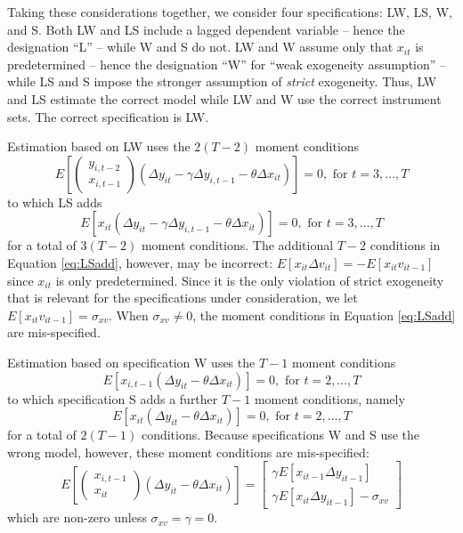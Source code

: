 Taking these considerations together, we consider four specifications: LW, LS, W, and S. 
Both LW and LS include a lagged dependent variable -- hence the designation ``L'' -- while W and S do not. 
LW and W assume only that $x_{it}$ is predetermined -- hence the designation ``W'' for ``weak exogeneity assumption'' -- while LS and S impose the stronger assumption of \emph{strict} exogeneity. 
Thus, LW and LS estimate the correct model while LW and W use the correct instrument sets. 
The correct specification is LW.

Estimation based on LW uses the $2(T - 2)$ moment conditions
	\begin{equation}
E\left[ \left(\begin{array}{c} y_{i,t-2}\\ x_{i,t-1}
\end{array}\right)\left(\Delta y_{it} - \gamma\Delta y_{i,t-1} -\theta \Delta x_{it}\right)\right] = 0, \mbox{ for } t = 3, \hdots, T
\end{equation}
to which LS adds 
	\begin{equation}
	\label{eq:LSadd}
	E\left[ x_{it}\left(\Delta y_{it} - \gamma\Delta y_{i,t-1} -\theta \Delta x_{it}\right)\right] = 0, \mbox{ for } t = 3, \hdots, T
\end{equation}
for a total of $3(T - 2)$ moment conditions. The additional $T-2$ conditions in Equation \ref{eq:LSadd}, however, may be incorrect: $E[x_{it}\Delta v_{it}] = -E[x_{it}v_{it-1}]$ since $x_{it}$ is only predetermined. Since it is the only violation of strict exogeneity that is relevant for the specifications under consideration, we let $E[x_{it}v_{it-1}] = \sigma_{xv}$. When $\sigma_{xv}\neq 0$, the moment conditions in Equation \ref{eq:LSadd} are mis-specified.


Estimation based on specification W uses the $T-1$ moment conditions
\begin{equation}
E\left[x_{i,t-1} \left(\Delta y_{it} - \theta \Delta x_{it}\right)\right] = 0, \mbox{ for } t = 2, \hdots, T
\end{equation}
to which specification S adds a further $T-1$ moment conditions, namely
\begin{equation}
\label{eq:Sadd}
E\left[x_{it} \left(\Delta y_{it} - \theta \Delta x_{it}\right)\right] = 0, \mbox{ for } t = 2, \hdots, T
\end{equation}
for a total of $2(T - 1)$ conditions. Because specifications W and S use the wrong model, however, these moment conditions are mis-specified:
\begin{equation}
\label{eq:trueexpect}
E\left[\left(\begin{array}{c}x_{i,t-1}\\x_{it}\end{array}\right) \left(\Delta y_{it} - \theta \Delta x_{it}\right)\right] = \left[\begin{array}{c}\gamma E[x_{it-1}\Delta y_{it-1}]\\\gamma E[x_{it}\Delta y_{it-1}] - \sigma_{xv}\end{array} \right]
\end{equation}
which are non-zero unless $\sigma_{xv} = \gamma = 0$.



